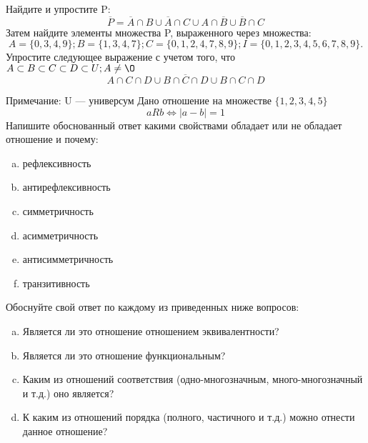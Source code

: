 \documentclass[10pt]{exam}
\begin{document}
\begin{questions}
\question
Найдите и упростите P:
\begin{equation*}
\overline{P} = \overline{A} \cap B \cup \overline{A} \cap C \cup A \cap \overline{B} \cup \overline{B} \cap C
\end{equation*}
Затем найдите элементы множества P, выраженного через множества:
\begin{equation*}
A = \{0, 3, 4, 9\}; 
B = \{1, 3, 4, 7\};
C = \{0, 1, 2, 4, 7, 8, 9\};
I = \{0, 1, 2, 3, 4, 5, 6, 7, 8, 9\}.
\end{equation*}\question
Упростите следующее выражение с учетом того, что $A\subset B \subset C \subset D \subset U; A \neq \O$
\begin{equation*}
A \cap C  \cap D \cup B \cap \overline{C} \cap D \cup B \cap C \cap D
\end{equation*}

Примечание: U — универсум\question
Дано отношение на множестве $\{1, 2, 3, 4, 5\}$ 
\begin{equation*}
aRb \iff |a-b| = 1
\end{equation*}
Напишите обоснованный ответ какими свойствами обладает или не обладает отношение и почему:   
\begin{enumerate} [a)]\setcounter{enumi}{0}
\item рефлексивность
\item антирефлексивность
\item симметричность
\item асимметричность
\item антисимметричность
\item транзитивность
\end{enumerate}

Обоснуйте свой ответ по каждому из приведенных ниже вопросов:
\begin{enumerate} [a)]\setcounter{enumi}{0}
    \item Является ли это отношение отношением эквивалентности?
    \item Является ли это отношение функциональным?
    \item Каким из отношений соответствия (одно-многозначным, много-многозначный и т.д.) оно является?
    \item К каким из отношений порядка (полного, частичного и т.д.) можно отнести данное отношение?
\end{enumerate}


\end{questions}
\end{document}
